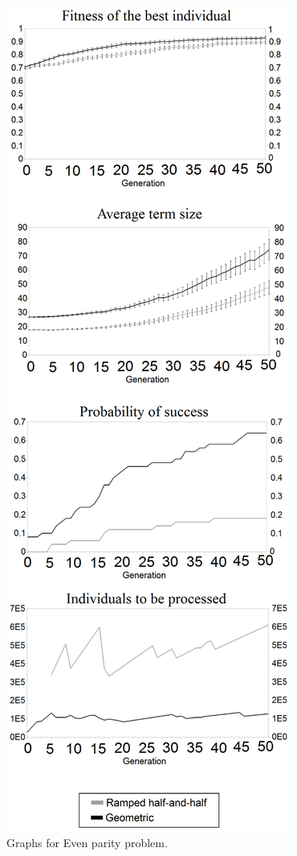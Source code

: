 \documentclass[conference]{IEEEtran}
\begin{document}
\begin{figure}[!ht]
  \centering
  \caption{Graphs for Even parity problem.}
  \includegraphics[scale=0.111]{imgs/EP.eps}
\end{figure}
\end{document}
